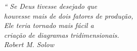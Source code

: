 \begin{epigrafe}
\vspace*{\fill}
\begin{flushright}
\textit{``
Se Deus tivesse desejado que\\
houvesse mais de dois fatores de produção,\\
Ele teria tornado mais fácil a\\
criação de diagramas tridimensionais.\\
Robert M. Solow
}
\end{flushright}
\end{epigrafe}